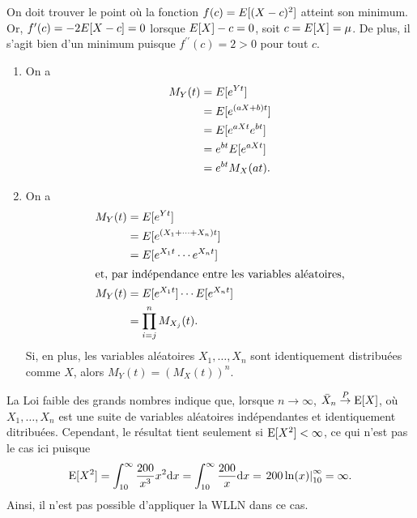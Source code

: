 \begin{solution}{1.7}
    On doit trouver le point où la fonction $f(c) = E [ (X - c)^2 ]$
    atteint son minimum. Or, $f^\prime(c) = -2 E [ X - c ] = 0$
    lorsque $E [ X ] - c = 0$, soit $c = E [ X ] = \mu$. De plus, il
    s'agit bien d'un minimum puisque $f^{\prime\prime}(c) = 2 > 0$
    pour tout $c$.
  
\end{solution}
\begin{solution}{1.8}
    \begin{enumerate}
    \item On a
      \begin{align*}
        M_Y(t)
        &= E [ e^{Yt} ] \\
        &= E [ e^{(aX + b)t} ] \\
        &= E [ e^{aXt} e^{bt} ] \\
        &= e^{bt} E [ e^{aXt} ] \\
        &= e^{bt} M_X(at).
      \end{align*}
    \item On a
      \begin{align*}
        M_Y(t)
        &= E [ e^{Yt} ]\\
        &= E [ e^{(X_1 + \dots + X_n) t} ]\\
        &= E [ e^{X_1 t} \cdots e^{X_n t} ] \\
        \intertext{et, par indépendance entre les variables
          aléatoires,}
        M_Y(t)
        &= E [ e^{X_1t} ] \cdots E [ e^{X_nt} ] \\
        &= \prod_{i = j}^n M_{X_j}(t).
      \end{align*}
      Si, en plus, les variables aléatoires $X_1, \dots, X_n$ sont
      identiquement distribuées comme $X$, alors $M_Y(t) =
      (M_X(t))^n$.
    \end{enumerate}
  
\end{solution}
\begin{solution}{1.9}
La Loi faible des grands nombres indique que, lorsque $n\to\infty$, $\bar X_n\stackrel{P}{\to}\operatorname{E}[X]$, où $X_1,\ldots,X_n$ est une suite de variables aléatoires indépendantes et identiquement ditribuées. Cependant, le résultat tient seulement si $\operatorname{E}[X^2] < \infty$, ce qui n'est pas le cas ici puisque
\begin{align*}
\operatorname{E}[X^2]=\int_{10}^\infty \frac{200}{x^3}x^2 \mbox{d} x =\int_{10}^\infty \frac{200}{x} \mbox{d} x = \left. 200\ln(x)\right|_{10}^\infty = \infty.
\end{align*}
Ainsi, il n'est pas possible d'appliquer la WLLN dans ce cas.
\end{solution}
